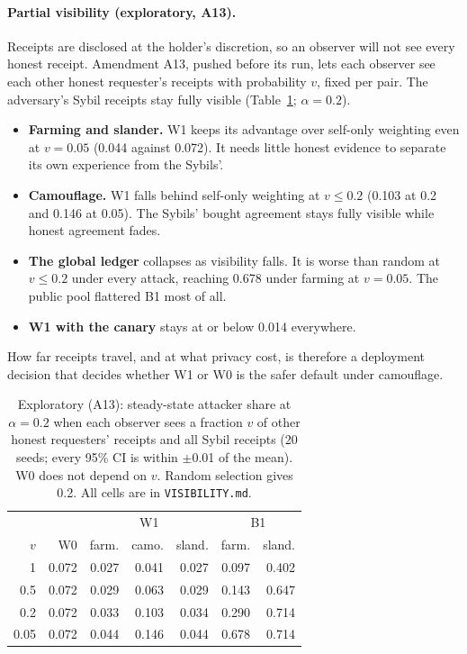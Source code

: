 \paragraph{Partial visibility (exploratory, A13).}
Receipts are disclosed at the holder's discretion, so an observer will
not see every honest receipt. Amendment A13, pushed before its run, lets
each observer see each other honest requester's receipts with probability
$v$, fixed per pair. The adversary's Sybil receipts stay fully visible
(Table~\ref{tab:vis}; $\alpha{=}0.2$).
\begin{itemize}
\item \textbf{Farming and slander.} W1 keeps its advantage over
  self-only weighting even at $v{=}0.05$ (0.044 against 0.072). It needs
  little honest evidence to separate its own experience from the Sybils'.
\item \textbf{Camouflage.} W1 falls behind self-only weighting at
  $v\le0.2$ (0.103 at 0.2 and 0.146 at 0.05). The Sybils' bought
  agreement stays fully visible while honest agreement fades.
\item \textbf{The global ledger} collapses as visibility falls. It is
  worse than random at $v\le0.2$ under every attack, reaching 0.678 under
  farming at $v{=}0.05$. The public pool flattered B1 most of all.
\item \textbf{W1 with the canary} stays at or below 0.014 everywhere.
\end{itemize}
How far receipts travel, and at what privacy cost, is therefore a
deployment decision that decides whether W1 or W0 is the safer default
under camouflage.

\begin{table}[t]
\caption{Exploratory (A13): steady-state attacker share at $\alpha{=}0.2$
when each observer sees a fraction $v$ of other honest requesters'
receipts and all Sybil receipts (20 seeds; every 95\% CI is within
$\pm$0.01 of the mean). W0 does not depend on $v$. Random selection gives
0.2. All cells are in \texttt{VISIBILITY.md}.}
\label{tab:vis}
\small
\begin{tabular}{@{}rrrrrrr@{}}
\toprule
 & & \multicolumn{3}{c}{W1} & \multicolumn{2}{c}{B1} \\
$v$ & W0 & farm. & camo. & sland. & farm. & sland. \\
\midrule
1 & 0.072 & 0.027 & 0.041 & 0.027 & 0.097 & 0.402 \\
0.5 & 0.072 & 0.029 & 0.063 & 0.029 & 0.143 & 0.647 \\
0.2 & 0.072 & 0.033 & 0.103 & 0.034 & 0.290 & 0.714 \\
0.05 & 0.072 & 0.044 & 0.146 & 0.044 & 0.678 & 0.714 \\
\bottomrule
\end{tabular}
\end{table}

